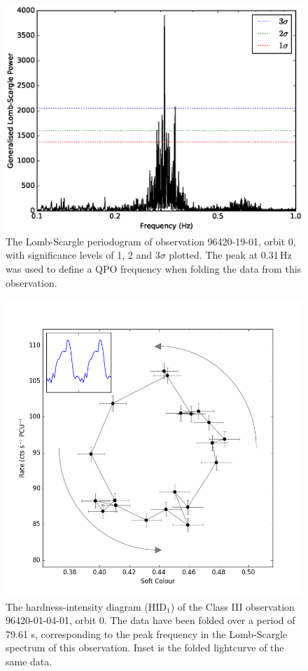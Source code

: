 \begin{figure}
    \includegraphics[width=\columnwidth, trim = 0mm 0mm 0mm 0mm]{images/LSVIII.eps}
    \captionsetup{singlelinecheck=off}
    \caption{The Lomb-Scargle periodogram of observation 96420-19-01, orbit 0, with significance levels of 1, 2 and 3$\sigma$ plotted.  The peak at 0.31\,Hz was used to define a QPO frequency when folding the data from this observation.}
   \label{fig:IIILS}
\end{figure}

\begin{figure}
    \includegraphics[width=\columnwidth, trim = 0mm 0mm 0mm 0mm]{images/Gloop.png}
    \captionsetup{singlelinecheck=off}
    \caption{The hardness-intensity diagram (HID$_1$) of the Class III observation 96420-01-04-01, orbit 0.  The data have been folded over a period of 79.61 s, corresponding to the peak frequency in the Lomb-Scargle spectrum of this observation.  Inset is the folded lightcurve of the same data.}
   \label{fig:LoopIII}
\end{figure}

